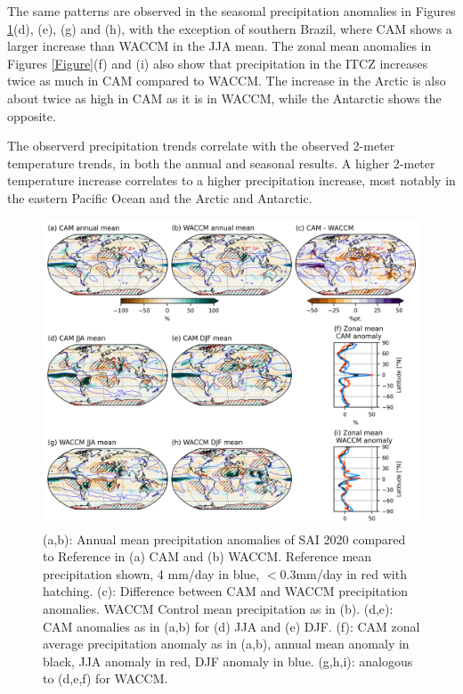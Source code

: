 The same patterns are observed in the seasonal precipitation anomalies in Figures \ref{fig:PRECT_20ref}(d), (e), (g) and (h), with the exception of southern Brazil, where CAM shows a larger increase than WACCM in the JJA mean. The zonal mean anomalies in Figures \ref{Figure}(f) and (i) also show that precipitation in the ITCZ increases twice as much in CAM compared to WACCM. The increase in the Arctic is also about twice as high in CAM as it is in WACCM, while the Antarctic shows the opposite. 

The observerd precipitation trends correlate with the observed 2-meter temperature trends, in both the annual and seasonal results. A higher 2-meter temperature increase correlates to a higher precipitation increase, most notably in the eastern Pacific Ocean and the Arctic and Antarctic. 

\begin{figure}[H]
	\centering
	\includegraphics[width=0.95\linewidth]{images/PRECT_20ref.png}
	\caption{(a,b): Annual mean precipitation anomalies of SAI 2020 compared to Reference in (a) CAM and (b) WACCM. Reference mean precipitation shown, 4 mm/day in blue, $<0.3$mm/day in red with hatching. (c): Difference between CAM and WACCM precipitation anomalies. WACCM Control mean precipitation as in (b). (d,e): CAM anomalies as in (a,b) for (d) JJA and (e) DJF. (f): CAM zonal average precipitation anomaly as in (a,b), annual mean anomaly in black, JJA anomaly in red, DJF anomaly in blue. (g,h,i): analogous to (d,e,f) for WACCM.}
	\label{fig:PRECT_20ref}
\end{figure}


